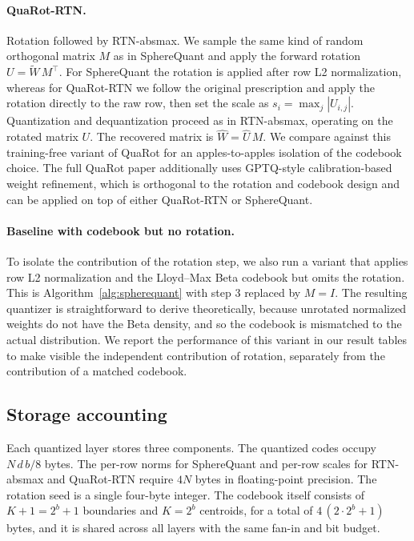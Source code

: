 \paragraph{QuaRot-RTN.}
Rotation followed by RTN-absmax. We sample the same kind of random
orthogonal matrix $M$ as in SphereQuant and apply the forward rotation
$U = \widetilde{W}\, M^\top$. For SphereQuant the rotation is applied after row
L2 normalization, whereas for QuaRot-RTN we follow the original
prescription and apply the rotation directly to the raw row, then set the
scale as $s_i = \max_j |U_{i,j}|$. Quantization and dequantization proceed
as in RTN-absmax, operating on the rotated matrix $U$. The recovered
matrix is $\widehat{W} = \widehat{U}\, M$. We compare against this
training-free variant of QuaRot for an apples-to-apples isolation of the
codebook choice. The full QuaRot paper additionally uses GPTQ-style
calibration-based weight refinement, which is orthogonal to the rotation
and codebook design and can be applied on top of either QuaRot-RTN or SphereQuant.

\paragraph{Baseline with codebook but no rotation.}
To isolate the contribution of the rotation step, we also run a variant
that applies row L2 normalization and the Lloyd--Max Beta codebook but
omits the rotation. This is Algorithm~\ref{alg:spherequant} with step 3 replaced by
$M = I$. The resulting quantizer is straightforward to derive
theoretically, because unrotated normalized weights do not have the
Beta density, and so the codebook is mismatched to the actual distribution.
We report the performance of this variant in our result tables to make
visible the independent contribution of rotation, separately from the
contribution of a matched codebook.

\subsection{Storage accounting}
\label{sec:method-storage}

Each quantized layer stores three components. The quantized codes occupy
$N\, d\, b / 8$ bytes. The per-row norms for SphereQuant and per-row scales for
RTN-absmax and QuaRot-RTN require $4N$ bytes in floating-point precision.
The rotation seed is a single four-byte integer. The codebook itself
consists of $K + 1 = 2^b + 1$ boundaries and $K = 2^b$ centroids, for a
total of $4\,(2 \cdot 2^b + 1)$ bytes, and it is shared across all layers
with the same fan-in and bit budget.

